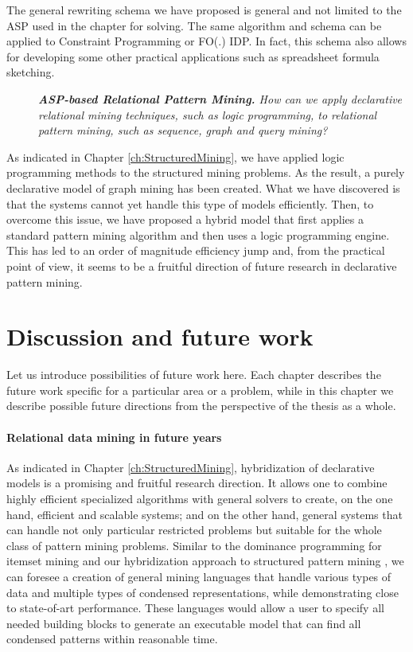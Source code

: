 The general rewriting schema we have proposed is general and not
limited to the ASP used in the chapter for solving. The same algorithm
    and schema can be applied to Constraint Programming or FO(.) IDP.
    In fact, this schema also allows for developing some other practical
    applications such as spreadsheet formula sketching.


\begin{description}
    \item[\cfour]  \textit{ \textbf{ASP-based Relational Pattern Mining.}
    How can we apply declarative relational mining techniques, such as
        logic programming, to relational pattern mining, such as sequence, graph and query mining?
}
\end{description}

As indicated in Chapter \ref{ch:StructuredMining}, we have applied 
logic programming methods to the structured mining problems. As the
result, 
a purely declarative model of graph mining has been created. What we
have discovered is that the systems cannot yet handle this type of
models efficiently. Then, to overcome this issue, we have proposed a hybrid model that
first applies a standard pattern mining algorithm and then uses a
logic programming engine. This has led to an order of magnitude
efficiency jump and, from the practical point of view, it seems to be
a fruitful direction of future research in declarative pattern
mining.

\section{Discussion and future work}
Let us introduce possibilities of future work here. Each chapter
describes the future work specific for a particular area or a problem,
while in this chapter we describe possible future directions from the
perspective of the thesis as a whole.


\paragraph{Relational data mining in future years}
As indicated in Chapter \ref{ch:StructuredMining}, hybridization of
declarative models is a promising and fruitful research direction. It
allows one to combine highly efficient specialized algorithms with
general solvers to create, on the one hand, efficient and scalable
systems; and on the other hand, general systems that can handle not
only particular restricted problems but suitable for the whole class of pattern
mining problems. Similar to the dominance programming for itemset
mining \parencite{dominanceprogramming} and our hybridization approach
to structured pattern mining \parencite{ruleml_hybrid}, we can foresee
a creation of 
general mining languages that handle various types of data and
multiple types of condensed representations, while demonstrating close to
state-of-art performance. These languages would allow a user to
specify all needed building blocks to generate an executable model
that can find all condensed patterns within reasonable time.


